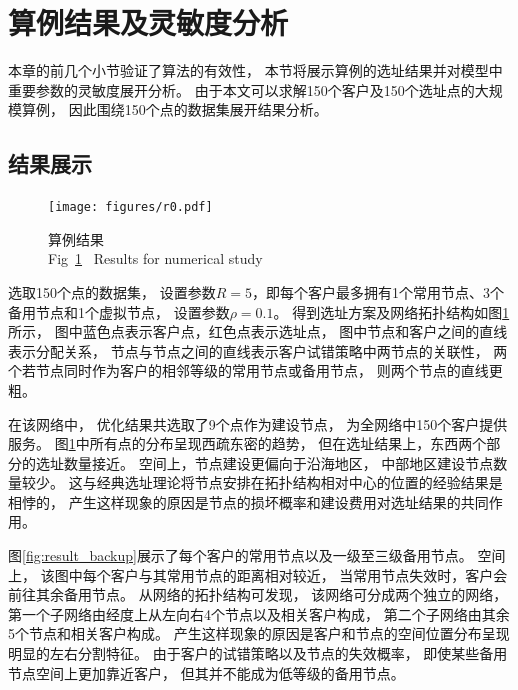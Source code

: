 \section{算例结果及灵敏度分析}
\label{sec:算例结果}
本章的前几个小节验证了算法的有效性，
本节将展示算例的选址结果并对模型中重要参数的灵敏度展开分析。
由于本文可以求解150个客户及150个选址点的大规模算例，
因此围绕150个点的数据集展开结果分析。

\subsection{结果展示}
\begin{figure}[!b] %
	\setlength{\belowcaptionskip}{-0.5cm} 
	  \centering
	  \texttt{[image: figures/r0.pdf]}
	  \caption{算例结果\\Fig~\ref{fig:result_map}~ Results for numerical study}
	  \label{fig:result_map}
\end{figure}

选取150个点的数据集，
设置参数$R=5$，即每个客户最多拥有1个常用节点、3个备用节点和1个虚拟节点，
设置参数$\rho=0.1$。
得到选址方案及网络拓扑结构如图\ref{fig:result_map}所示，
图中蓝色点表示客户点，红色点表示选址点，
图中节点和客户之间的直线表示分配关系，
节点与节点之间的直线表示客户试错策略中两节点的关联性，
两个若节点同时作为客户的相邻等级的常用节点或备用节点，
则两个节点的直线更粗。

在该网络中，
优化结果共选取了9个点作为建设节点，
为全网络中150个客户提供服务。
图\ref{fig:result_map}中所有点的分布呈现西疏东密的趋势，
但在选址结果上，东西两个部分的选址数量接近。
空间上，节点建设更偏向于沿海地区，
中部地区建设节点数量较少。
这与经典选址理论将节点安排在拓扑结构相对中心的位置的经验结果是相悖的，
产生这样现象的原因是节点的损坏概率和建设费用对选址结果的共同作用。

图\ref{fig:result_backup}展示了每个客户的常用节点以及一级至三级备用节点。
空间上，
该图中每个客户与其常用节点的距离相对较近，
当常用节点失效时，客户会前往其余备用节点。
从网络的拓扑结构可发现，
该网络可分成两个独立的网络，
第一个子网络由经度上从左向右4个节点以及相关客户构成，
第二个子网络由其余5个节点和相关客户构成。
产生这样现象的原因是客户和节点的空间位置分布呈现明显的左右分割特征。
由于客户的试错策略以及节点的失效概率，
即使某些备用节点空间上更加靠近客户，
但其并不能成为低等级的备用节点。

